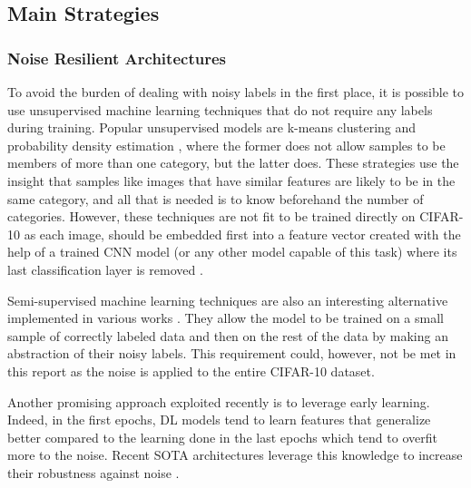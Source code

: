 \documentclass[11pt,twocolumn,letterpaper]{article}
\begin{document}
\subsection{Main Strategies}

\subsubsection{Noise Resilient Architectures}

To avoid the burden of dealing with noisy labels in the first place, it is possible to use unsupervised machine learning techniques that do not require any labels during training. Popular unsupervised models are k-means clustering \cite{bahriDeepKNNNoisy2020} and probability density estimation \cite{xiaAdaptiveGeneralModel2022}, where the former does not allow samples to be members of more than one category, but the latter does. These strategies use the insight that samples like images that have similar features are likely to be in the same category, and all that is needed is to know beforehand the number of categories. However, these techniques are not fit to be trained directly on CIFAR-10 as each image, should be embedded first into a feature vector created with the help of a trained CNN model (or any other model capable of this task) where its last classification layer is removed \cite{sejutiHybridCNNKNN2023a}.

Semi-supervised machine learning techniques are also an interesting alternative implemented in various works \cite{tongxiaoLearningMassiveNoisy2015}. They allow the model to be trained on a small sample of correctly labeled data and then on the rest of the data by making an abstraction of their noisy labels. This requirement could, however, not be met in this report as the noise is applied to the entire CIFAR-10 dataset.

Another promising approach exploited recently is to leverage early learning. Indeed, in the first epochs, DL models tend to learn features that generalize better compared to the learning done in the last epochs which tend to overfit more to the noise. Recent SOTA architectures leverage this knowledge to increase their robustness against noise \cite{liuEarlyLearningRegularizationPrevents2020} \cite{baiUnderstandingImprovingEarly2021}.
\end{document}
